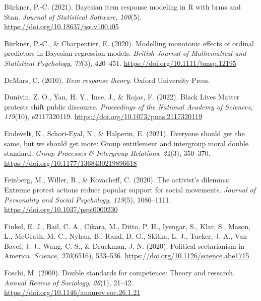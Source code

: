 \documentclass[12pt, letterpaper]{article}
\newenvironment{CSLReferences}[2]{}{}
\begin{document}
\begin{CSLReferences}{1}{0}
\leavevmode{}%
Bürkner, P.-C. (2021). Bayesian item response modeling in {R} with brms
and {Stan}. \emph{Journal of Statistical Software}, \emph{100}(5).
\url{https://doi.org/10.18637/jss.v100.i05}

\leavevmode{}%
Bürkner, P.-C., \& Charpentier, E. (2020). Modelling monotonic effects
of ordinal predictors in {Bayesian} regression models. \emph{British
Journal of Mathematical and Statistical Psychology}, \emph{73}(3),
420--451. \url{https://doi.org/10.1111/bmsp.12195}

\leavevmode{}%
DeMars, C. (2010). \emph{Item response theory}. Oxford University Press.

\leavevmode{}%
Dunivin, Z. O., Yan, H. Y., Ince, J., \& Rojas, F. (2022). Black {Lives}
{Matter} protests shift public discourse. \emph{Proceedings of the
National Academy of Sciences}, \emph{119}(10), e2117320119.
\url{https://doi.org/10.1073/pnas.2117320119}

\leavevmode{}%
Endevelt, K., Schori-Eyal, N., \& Halperin, E. (2021). Everyone should
get the same, but we should get more: Group entitlement and intergroup
moral double standard. \emph{Group Processes \& Intergroup Relations},
\emph{24}(3), 350--370. \url{https://doi.org/10.1177/1368430219896618}

\leavevmode{}%
Feinberg, M., Willer, R., \& Kovacheff, C. (2020). The activist's
dilemma: {Extreme} protest actions reduce popular support for social
movements. \emph{Journal of Personality and Social Psychology},
\emph{119}(5), 1086--1111. \url{https://doi.org/10.1037/pspi0000230}

\leavevmode{}%
Finkel, E. J., Bail, C. A., Cikara, M., Ditto, P. H., Iyengar, S., Klar,
S., Mason, L., McGrath, M. C., Nyhan, B., Rand, D. G., Skitka, L. J.,
Tucker, J. A., Van Bavel, J. J., Wang, C. S., \& Druckman, J. N. (2020).
Political sectarianism in {America}. \emph{Science}, \emph{370}(6516),
533--536. \url{https://doi.org/10.1126/science.abe1715}

\leavevmode{}%
Foschi, M. (2000). Double standards for competence: Theory and research.
\emph{Annual Review of Sociology}, \emph{26}(1), 21--42.
\url{https://doi.org/10.1146/annurev.soc.26.1.21}


\end{CSLReferences}
\end{document}

